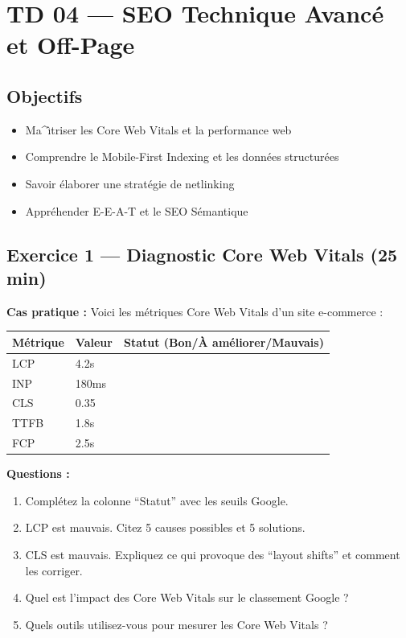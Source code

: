 \documentclass[12pt,a4paper]{report}
\begin{document}
\chapter{TD 04 --- SEO Technique Avanc\'{e} et Off-Page}

\section{Objectifs}
\begin{itemize}
    \item Ma^{\^\i}triser les Core Web Vitals et la performance web
    \item Comprendre le Mobile-First Indexing et les donn\'{e}es structur\'{e}es
    \item Savoir \'{e}laborer une strat\'{e}gie de netlinking
    \item Appr\'{e}hender E-E-A-T et le SEO S\'{e}mantique
\end{itemize}

\section{Exercice 1 --- Diagnostic Core Web Vitals (25 min)}

\textbf{Cas pratique :} Voici les m\'{e}triques Core Web Vitals d'un site e-commerce :

\begin{longtable}{lll}
\toprule
M\'{e}trique & Valeur & Statut (Bon/\`{A} am\'{e}liorer/Mauvais) \\
\midrule
\endhead
\bottomrule
\endfoot
LCP & 4.2s & \\
INP & 180ms & \\
CLS & 0.35 & \\
TTFB & 1.8s & \\
FCP & 2.5s & \\
\bottomrule
\end{longtable}

\textbf{Questions :}
\begin{enumerate}
    \item Compl\'{e}tez la colonne ``Statut'' avec les seuils Google.
    \item LCP est mauvais. Citez 5 causes possibles et 5 solutions.
    \item CLS est mauvais. Expliquez ce qui provoque des ``layout shifts'' et comment les corriger.
    \item Quel est l'impact des Core Web Vitals sur le classement Google ?
    \item Quels outils utilisez-vous pour mesurer les Core Web Vitals ?
\end{enumerate}
\end{document}
